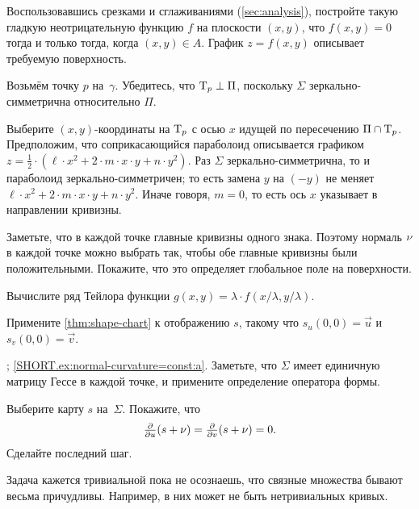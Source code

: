 \begin{multicols}{2}
Воспользовавшись срезками и сглаживаниями (\ref{sec:analysis}), постройте такую гладкую неотрицательную функцию $f$ на плоскости $(x,y)$, что $f(x,y)=0$ тогда и только тогда, когда $(x,y)\in A$.
График $z=f(x,y)$ описывает требуемую поверхность.


\setcounter{eqtn}{0}

Возьмём точку $p$ на~$\gamma$.
Убедитесь, что $\mathrm{T}_p\perp \Pi$, поскольку $\Sigma$ зеркально-симметрична относительно $\Pi$.

Выберите $(x,y)$-координаты на $\mathrm{T}_p$ с осью $x$ идущей по пересечению $\Pi\cap \mathrm{T}_p$.
Предположим, что соприкасающийся параболоид описывается графиком 
$z=\tfrac12\cdot(\ell\cdot x^2+2\cdot m\cdot x\cdot y+n\cdot y^2)$.
Раз $\Sigma$ зеркально-симметрична, то и параболоид зеркально-симметричен;
то есть замена $y$ на $(-y)$ не меняет 
$\ell\cdot x^2+2\cdot m\cdot x\cdot y+n\cdot y^2$.
Иначе говоря, $m=0$, то есть ось $x$ указывает в направлении кривизны.

Заметьте, что в каждой точке главные кривизны одного знака.
Поэтому нормаль $\nu$ в каждой точке можно выбрать так, чтобы обе главные кривизны были положительными.
Покажите, что это определяет глобальное поле на поверхности.

Вычислите ряд Тейлора функции $g(x,y)= \lambda \cdot f( x/ \lambda , y/\lambda)$.

Примените \ref{thm:shape-chart} к отображению $s$, такому что $s_u(0,0)=\vec u$ и $s_v(0,0)=\vec v$.

\parbf{\ref{ex:normal-curvature=const}}; \ref{SHORT.ex:normal-curvature=const:a}.
Заметьте, что $\Sigma$ имеет единичную матрицу Гессе в каждой точке, и примените определение оператора формы.

Выберите карту $s$ на~$\Sigma$.
Покажите, что
\[\tfrac{\partial }{\partial u}(s+\nu)
=
\tfrac{\partial }{\partial v}(s+\nu)
=
0.\]
Сделайте последний шаг.

Задача кажется тривиальной пока не осознаешь, что связные множества бывают весьма причудливы.
Например, в них может не быть нетривиальных кривых.


\end{multicols}
